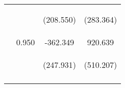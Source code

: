 \begin{tabular}{lccc}
 & \begin{footnotesize}\end{footnotesize} & \begin{footnotesize}(208.550)\end{footnotesize} & \begin{footnotesize}(283.364)\end{footnotesize}\\
\noalign{\smallskip} & 0.950 & -362.349 & 920.639\\
 & \begin{footnotesize}\end{footnotesize} & \begin{footnotesize}(247.931)\end{footnotesize} & \begin{footnotesize}(510.207)\end{footnotesize}\\
\noalign{\smallskip}\hline\end{tabular}\\
